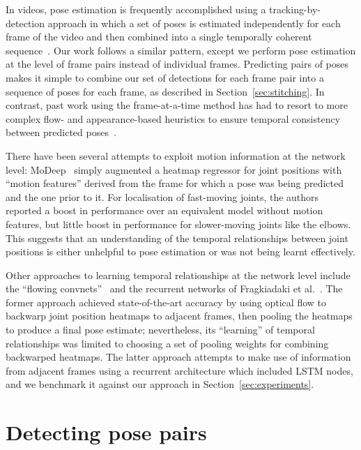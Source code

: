 \documentclass[runningheads]{llncs}
\begin{document}
In videos, pose estimation is frequently accomplished using a
tracking-by-detection approach in which a set of poses is estimated
independently for each frame of the video and then combined into a single
temporally coherent
sequence~\cite{andriluka2010monocular,ferrari2008progressive,cherian2014mixing,ramanan2005strike}.
Our work follows a similar pattern, except we perform pose estimation at the
level of frame pairs instead of individual frames. Predicting pairs of poses
makes it simple to combine our set of detections for each frame pair into a
sequence of poses for each frame, as described in Section~\ref{sec:stitching}.
In contrast, past work using the frame-at-a-time method has had to resort to
more complex flow- and appearance-based heuristics to ensure temporal
consistency between predicted poses~\cite{cherian2014mixing}.

There have been several attempts to exploit motion information at the network
level: MoDeep~\cite{jain2014modeep} simply augmented a heatmap regressor for
joint positions with ``motion features'' derived from the frame for which a pose
was being predicted and the one prior to it. For localisation of fast-moving
joints, the authors reported a boost in performance over an equivalent model
without motion features, but little boost in performance for slower-moving
joints like the elbows. This suggests that an understanding of the temporal
relationships between joint positions is either unhelpful to pose estimation or
was not being learnt effectively.

Other approaches to learning temporal relationships at the network level include
the ``flowing convnets''~\cite{pfister2015flowing} and the recurrent networks of
Fragkiadaki et al.~\cite{fragkiadaki2015recurrent}. The former approach achieved
state-of-the-art accuracy by using optical flow to backwarp joint position
heatmaps to adjacent frames, then pooling the heatmaps to produce a final pose
estimate; nevertheless, its ``learning'' of temporal relationships was limited
to choosing a set of pooling weights for combining backwarped heatmaps. The
latter approach attempts to make use of information from adjacent frames using
a recurrent architecture which included LSTM nodes, and we benchmark it against
our approach in Section~\ref{sec:experiments}.

\section{Detecting pose pairs}
\end{document}
